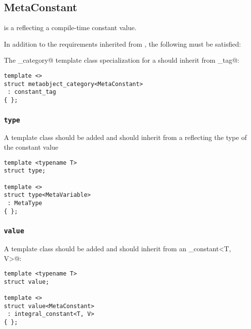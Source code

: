 \subsection{MetaConstant}
\label{concept-MetaConstant}


 is a  reflecting a compile-time constant value.

In addition to the requirements inherited from , the following must
be satisfied:

The \verb@metaobject_category@ template class specialization for a  should
inherit from \verb@constant_tag@:

\begin{verbatim}
template <>
struct metaobject_category<MetaConstant>
 : constant_tag
{ };
\end{verbatim}

\subsubsection{\texttt{type}}

A template class \verb@type@ should be added and should inherit
from a  reflecting the type of the constant value

\begin{verbatim}
template <typename T>
struct type;

template <>
struct type<MetaVariable>
 : MetaType
{ };
\end{verbatim}

\subsubsection{\texttt{value}}

A template class \verb@value@ should be added and should inherit
from an \verb@integral_constant<T, V>@:

\begin{verbatim}
template <typename T>
struct value;

template <>
struct value<MetaConstant>
 : integral_constant<T, V>
{ };
\end{verbatim}

